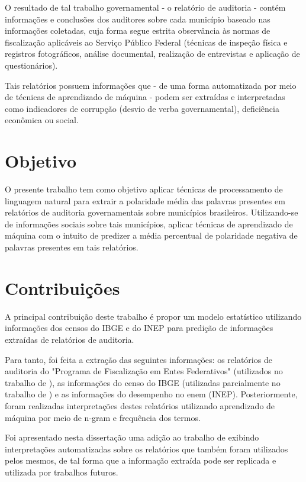 O resultado de tal trabalho governamental - o relatório de auditoria - contém informações e conclusões dos auditores sobre cada município baseado nas informações coletadas, cuja forma segue estrita observância às normas de fiscalização aplicáveis ao Serviço Público Federal (técnicas de inspeção física e registros fotográficos, análise documental, realização de entrevistas e aplicação de questionários).

Tais relatórios possuem informações que - de uma forma automatizada por meio de técnicas de aprendizado de máquina - podem ser extraídas e interpretadas como indicadores de corrupção (desvio de verba governamental), deficiência econômica ou social.

\section{Objetivo}
\label{sec:objetivo}

O presente trabalho tem como objetivo aplicar técnicas de processamento de linguagem natural para extrair a polaridade média das palavras presentes em relatórios de auditoria governamentais sobre municípios brasileiros. Utilizando-se de informações sociais sobre tais municípios, aplicar técnicas de aprendizado de máquina com o intuito de predizer a média percentual de polaridade negativa de palavras presentes em tais relatórios.

\section{Contribuições}
\label{sec:contribuicoes}

A principal contribuição deste trabalho é propor um modelo estatístico utilizando informações dos censos do IBGE e do INEP para predição de informações extraídas de relatórios de auditoria.

Para tanto, foi feita a extração das seguintes informações: os relatórios de auditoria do "Programa de Fiscalização em Entes Federativos" (utilizados no trabalho de \citet{FerrazFinan2008}), as informações do censo do IBGE (utilizadas parcialmente no trabalho de \citet{Goldani2001}) e as informações do desempenho no enem (INEP). Posteriormente, foram realizadas interpretações destes relatórios utilizando aprendizado de máquina por meio de n-gram e frequência dos termos.

Foi apresentado nesta dissertação uma adição ao trabalho de \citet{FerrazFinan2008} exibindo interpretações automatizadas sobre os relatórios que também foram utilizados pelos mesmos, de tal forma que a informação extraída pode ser replicada e utilizada por trabalhos futuros.

